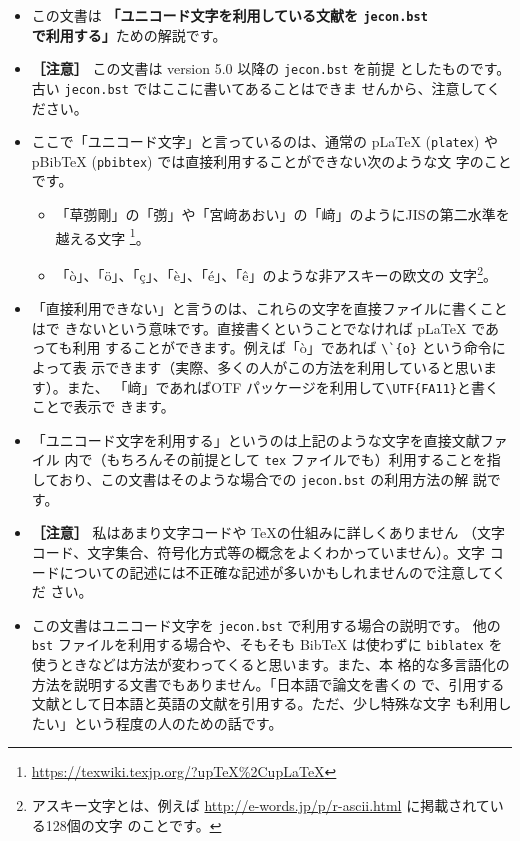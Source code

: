\documentclass[a4paper,10pt]{bxjsarticle}
\begin{document}
\begin{itemize}
 \item この文書は \textbf{「ユニコード文字を利用している文献を
       \texttt{jecon.bst} で利用する」}ための解説です。
 \item \textbf{［注意］} この文書は version 5.0 以降の \texttt{jecon.bst} を前提
       としたものです。古い \texttt{jecon.bst} ではここに書いてあることはできま
       せんから、注意してください。
 \item ここで「ユニコード文字」と言っているのは、通常の pLaTeX (\texttt{platex})
       や pBibTeX (\texttt{pbibtex}) では直接利用することができない次のような文
       字のことです。
       \begin{itemize}
        \item 「草彅剛」の「彅」や「宮﨑あおい」の「﨑」のようにJISの第二水準を
              越える文字
              \footnote{\url{https://texwiki.texjp.org/?upTeX\%2CupLaTeX}}。
        \item 「ò」、「ö」、「ç」、「è」、「é」、「ê」のような非アスキーの欧文の
              文字\footnote{アスキー文字とは、例えば
              \url{http://e-words.jp/p/r-ascii.html} に掲載されている128個の文字
              のことです。}。
       \end{itemize}
 \item 「直接利用できない」と言うのは、これらの文字を直接ファイルに書くことはで
       きないという意味です。直接書くということでなければ pLaTeX であっても利用
       することができます。例えば「ò」であれば \verb|\`{o}| という命令によって表
       示できます（実際、多くの人がこの方法を利用していると思います）。また、
       「﨑」であればOTF パッケージを利用して\verb|\UTF{FA11}|と書くことで表示で
       きます。
 \item 「ユニコード文字を利用する」というのは上記のような文字を直接文献ファイル
       内で（もちろんその前提として \texttt{tex} ファイルでも）利用することを指
       しており、この文書はそのような場合での \texttt{jecon.bst} の利用方法の解
       説です。
 \item \textbf{［注意］} 私はあまり文字コードや \TeX の仕組みに詳しくありません
       （文字コード、文字集合、符号化方式等の概念をよくわかっていません）。文字
       コードについての記述には不正確な記述が多いかもしれませんので注意してくだ
       さい。
 \item この文書はユニコード文字を \texttt{jecon.bst} で利用する場合の説明です。
       他の \texttt{bst} ファイルを利用する場合や、そもそも BibTeX は使わずに
       \texttt{biblatex} を使うときなどは方法が変わってくると思います。また、本
       格的な多言語化の方法を説明する文書でもありません。「日本語で論文を書くの
       で、引用する文献として日本語と英語の文献を引用する。ただ、少し特殊な文字
       も利用したい」という程度の人のための話です。
\end{itemize}
\end{document}
